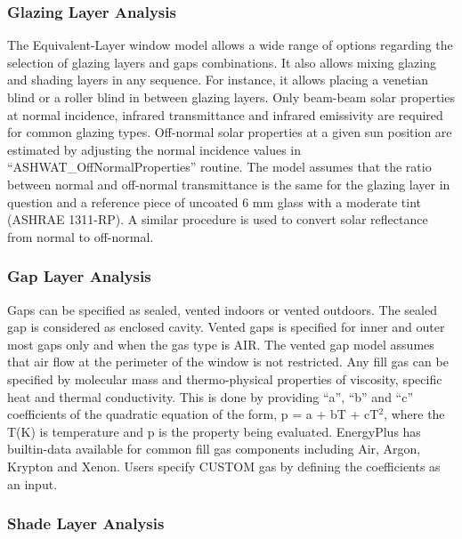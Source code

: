 \subsubsection{Glazing Layer Analysis}\label{glazing-layer-analysis}

The Equivalent-Layer window model allows a wide range of options regarding the selection of glazing layers and gaps combinations. It also allows mixing glazing and shading layers in any sequence. For instance, it allows placing a venetian blind or a roller blind in between glazing layers. Only beam-beam solar properties at normal incidence, infrared transmittance and infrared emissivity are required for common glazing types. Off-normal solar properties at a given sun position are estimated by adjusting the normal incidence values in ``ASHWAT\_OffNormalProperties'' routine. The model assumes that the ratio between normal and off-normal transmittance is the same for the glazing layer in question and a reference piece of uncoated 6 mm glass with a moderate tint (ASHRAE 1311-RP). A similar procedure is used to convert solar reflectance from normal to off-normal.

\subsubsection{Gap Layer Analysis}\label{gap-layer-analysis}

Gaps can be specified as sealed, vented indoors or vented outdoors. The sealed gap is considered as enclosed cavity. Vented gaps is specified for inner and outer most gaps only and when the gas type is AIR. The vented gap model assumes that air flow at the perimeter of the window is not restricted. Any fill gas can be specified by molecular mass and thermo-physical properties of viscosity, specific heat and thermal conductivity. This is done by providing ``a'', ``b'' and ``c'' coefficients of the quadratic equation of the form, p = a + bT + cT\(^{2}\), where the T(K) is temperature and p is the property being evaluated. EnergyPlus has builtin-data available for common fill gas components including Air, Argon, Krypton and Xenon. Users specify CUSTOM gas by defining the coefficients as an input.

\subsubsection{Shade Layer Analysis}\label{shade-layer-analysis}

